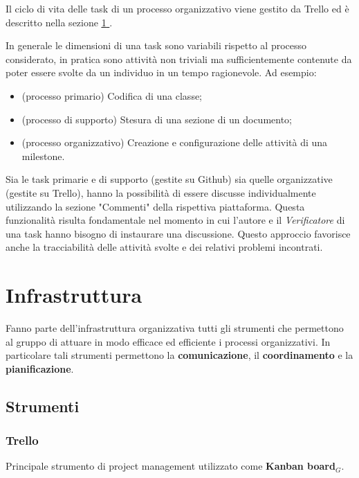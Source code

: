 Il ciclo di vita delle task di un processo organizzativo viene gestito da Trello ed è descritto nella sezione \underline{\ref{sec:Infrastruttura} }.

In generale le dimensioni di una task sono variabili rispetto al processo considerato, in pratica sono attività non triviali ma sufficientemente contenute da poter essere svolte da un individuo in un tempo ragionevole. Ad esempio:
\begin{itemize}
  \item (processo primario) Codifica di una classe;
  \item (processo di supporto) Stesura di una sezione di un documento;
  \item (processo organizzativo) Creazione e configurazione delle attività di una milestone.
\end{itemize}

Sia le task primarie e di supporto (gestite su Github) sia quelle organizzative (gestite su Trello), hanno la possibilità di essere discusse individualmente utilizzando la sezione "Commenti" della rispettiva piattaforma. Questa funzionalità risulta fondamentale nel momento in cui l'autore e il \textit{Verificatore} di una task hanno bisogno di instaurare una discussione. Questo approccio favorisce anche la tracciabilità delle attività svolte e dei relativi problemi incontrati.



\section{Infrastruttura}\label{sec:Infrastruttura}
Fanno parte dell'infrastruttura organizzativa tutti gli strumenti che permettono al gruppo di attuare in modo efficace ed efficiente i processi organizzativi. In particolare tali strumenti permettono la \textbf{comunicazione}, il \textbf{coordinamento} e la \textbf{pianificazione}.

\subsection{Strumenti}
\subsubsection{Trello}
Principale strumento di project management utilizzato come \textbf{Kanban board}$_G$.

